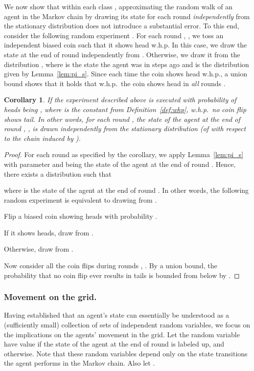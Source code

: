 \documentclass[11pt]{article}
\newtheorem{corollary}[theorem]{Corollary}
\begin{document}
We now show that within each class , approximating the random walk of an agent in the Markov chain by drawing its state for each round  \emph{independently} from the stationary distribution  does not introduce a substantial error. To this end, consider the following random experiment . For each round , , we toss an independent biased coin such that it shows head w.h.p. In this case, we draw the state at the end of round  independently from . Otherwise, we draw it from the distribution , where  is the state the agent was in  steps ago and  is the distribution given by Lemma~\ref{lem:pi_s}. Since each time the coin shows head w.h.p., a union bound shows that it holds that w.h.p.\ the coin shows head in \emph{all} rounds .

\begin{corollary}\label{cor:coin}
	If the experiment  described above is executed with probability of heads being , where  is the constant from Definition~\ref{def:whp}, w.h.p.\ no coin flip shows tail. In other words, for each round , the state of the agent at the end of round , , is drawn independently from the stationary distribution  (of  with respect to the chain induced by ).
\end{corollary}

\begin{proof}
For each round  as specified by the corollary, we apply Lemma~\ref{lem:pi_s} with parameter  and  being the state of the agent at the end of round . Hence, there exists a distribution  such that

where  is the state of the agent at the end of round . In other words, the following random experiment is equivalent to drawing from .
\begin{compactenum}
\item Flip a biased coin showing heads with probability .
\item If it shows heads, draw from .
\item Otherwise, draw from .
\end{compactenum}
Now consider all the coin flips during rounds , . By a union bound, the probability that no coin flip ever results in tails is bounded from below by .
\end{proof}

\subsubsection{Movement on the grid.}
\label{sec:movement}

Having established that an agent's state can essentially be understood as a (sufficiently small) collection of sets of independent random variables, we focus on the implications on the agents' movement in the grid. Let the random variable  have value  if the state of the agent at the end of round  is labeled up, and  otherwise. Note that these random variables depend only on the state transitions the agent performs in the Markov chain. Also let .
\end{document}
